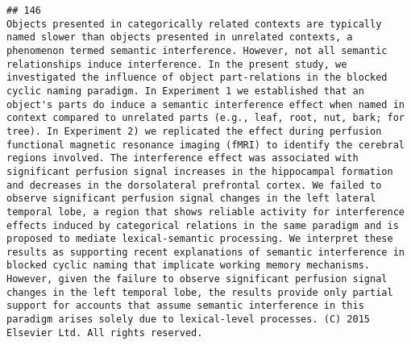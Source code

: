 \documentclass[
  english,
  man]{apa6}
\begin{document}
\begin{verbatim}
## 146                                                                                                                                                                                                                                                                                                                                                                                                                                                                                                                                                                                                                                                                                                                                                                                                                                                                                                                                                                                                                                                   Objects presented in categorically related contexts are typically named slower than objects presented in unrelated contexts, a phenomenon termed semantic interference. However, not all semantic relationships induce interference. In the present study, we investigated the influence of object part-relations in the blocked cyclic naming paradigm. In Experiment 1 we established that an object's parts do induce a semantic interference effect when named in context compared to unrelated parts (e.g., leaf, root, nut, bark; for tree). In Experiment 2) we replicated the effect during perfusion functional magnetic resonance imaging (fMRI) to identify the cerebral regions involved. The interference effect was associated with significant perfusion signal increases in the hippocampal formation and decreases in the dorsolateral prefrontal cortex. We failed to observe significant perfusion signal changes in the left lateral temporal lobe, a region that shows reliable activity for interference effects induced by categorical relations in the same paradigm and is proposed to mediate lexical-semantic processing. We interpret these results as supporting recent explanations of semantic interference in blocked cyclic naming that implicate working memory mechanisms. However, given the failure to observe significant perfusion signal changes in the left temporal lobe, the results provide only partial support for accounts that assume semantic interference in this paradigm arises solely due to lexical-level processes. (C) 2015 Elsevier Ltd. All rights reserved.

\end{verbatim}
\end{document}
